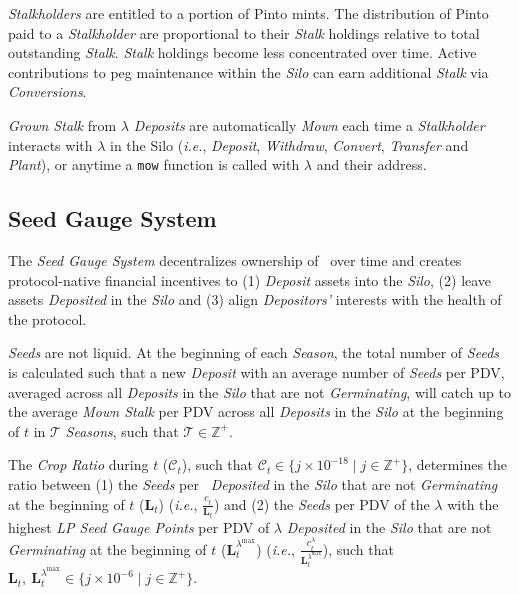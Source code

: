 \documentclass[tikz]{article}
\newcommand{\code}[1]{\texttt{#1}}
\newcommand{\term}[1]{\textsl{#1}}
\newcommand{\Pinto}{} %
\newcommand{\pinto}{} %
\begin{document}
\term{Stalkholders} are entitled to a portion of Pinto mints. The distribution of Pinto paid to a \term{Stalkholder} are proportional to their \term{Stalk} holdings relative to total outstanding \term{Stalk}. \term{Stalk} holdings become less concentrated over time. Active contributions to peg maintenance within the \term{Silo} can earn additional \term{Stalk} via \term{Conversions}.
 
\term{Grown Stalk} from $\lambda$ \term{Deposits} are automatically \term{Mown} each time a \term{Stalkholder} interacts with $\lambda$ in the Silo (\textit{i.e.}, \term{Deposit}, \term{Withdraw}, \term{Convert}, \term{Transfer} and \term{Plant}), or anytime a \code{mow} function is called with $\lambda$ and their address.


\vspace*{-1.35mm}
\subsection{Seed Gauge System}
\vspace*{-1.35mm}

The \term{Seed Gauge System} decentralizes ownership of \Pinto\ over time and creates protocol-native financial incentives to (1) \term{Deposit} assets into the \term{Silo}, (2) leave assets \term{Deposited} in the \term{Silo} and (3) align \term{Depositors'} interests with the health of the protocol.

\term{Seeds} are not liquid. At the beginning of each \term{Season}, the total number of \term{Seeds} is calculated such that a new \term{Deposit} with an average number of \term{Seeds} per PDV, averaged across all \term{Deposits} in the \term{Silo} that are not \term{Germinating}, will catch up to the average \term{Mown Stalk} per PDV across all \term{Deposits} in the \term{Silo} at the beginning of $t$ in $\mathscr{T}$ \term{Seasons}, such that $\mathscr{T}\in \mathbb{Z}^{+}$.

The \term{Crop Ratio} during $t$ ($\mathscr{C}_{t}$), such that $\mathscr{C}_{t} \in \{j \times 10^{-18} \mid j \in \mathbb{Z}^{+} \}$, determines the ratio between (1) the \term{Seeds} per \Pinto\ \term{Deposited} in the \term{Silo} that are not \term{Germinating} at the beginning of $t$ ($\mathbf{L}_{t}^{\pinto}$) (\textit{i.e.}, $\frac{c_{t}^{\pinto}}{\mathbf{L}_{t}^{\pinto}}$) and (2) the \term{Seeds} per PDV of the $\lambda$ with the highest \term{LP Seed Gauge Points} per PDV of $\lambda$ \term{Deposited} in the \term{Silo} that are not \term{Germinating} at the beginning of $t$ ($\mathbf{L}_{t}^{\lambda^{\text{max}}}$) (\textit{i.e.}, $\frac{c_{t}^{\lambda}}{\mathbf{L}_{t}^{\lambda^{\text{max}}}}$), such that $\mathbf{L}_{t}^{\pinto},\ \mathbf{L}_{t}^{\lambda^{\text{max}}} \in \{j \times 10^{-6} \mid j \in \mathbb{Z}^{+} \}$.
\end{document}
